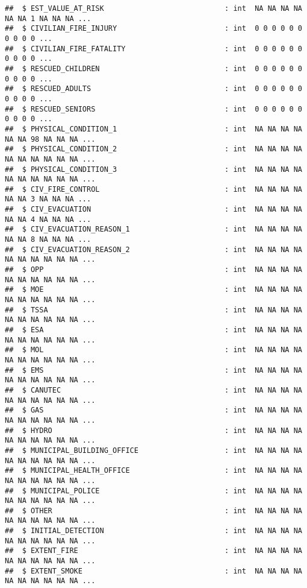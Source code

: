 \documentclass[]{article}
\begin{document}
\begin{verbatim}
##  $ EST_VALUE_AT_RISK                            : int  NA NA NA NA NA NA 1 NA NA NA ...
##  $ CIVILIAN_FIRE_INJURY                         : int  0 0 0 0 0 0 0 0 0 0 ...
##  $ CIVILIAN_FIRE_FATALITY                       : int  0 0 0 0 0 0 0 0 0 0 ...
##  $ RESCUED_CHILDREN                             : int  0 0 0 0 0 0 0 0 0 0 ...
##  $ RESCUED_ADULTS                               : int  0 0 0 0 0 0 0 0 0 0 ...
##  $ RESCUED_SENIORS                              : int  0 0 0 0 0 0 0 0 0 0 ...
##  $ PHYSICAL_CONDITION_1                         : int  NA NA NA NA NA NA 98 NA NA NA ...
##  $ PHYSICAL_CONDITION_2                         : int  NA NA NA NA NA NA NA NA NA NA ...
##  $ PHYSICAL_CONDITION_3                         : int  NA NA NA NA NA NA NA NA NA NA ...
##  $ CIV_FIRE_CONTROL                             : int  NA NA NA NA NA NA 3 NA NA NA ...
##  $ CIV_EVACUATION                               : int  NA NA NA NA NA NA 4 NA NA NA ...
##  $ CIV_EVACUATION_REASON_1                      : int  NA NA NA NA NA NA 8 NA NA NA ...
##  $ CIV_EVACUATION_REASON_2                      : int  NA NA NA NA NA NA NA NA NA NA ...
##  $ OPP                                          : int  NA NA NA NA NA NA NA NA NA NA ...
##  $ MOE                                          : int  NA NA NA NA NA NA NA NA NA NA ...
##  $ TSSA                                         : int  NA NA NA NA NA NA NA NA NA NA ...
##  $ ESA                                          : int  NA NA NA NA NA NA NA NA NA NA ...
##  $ MOL                                          : int  NA NA NA NA NA NA NA NA NA NA ...
##  $ EMS                                          : int  NA NA NA NA NA NA NA NA NA NA ...
##  $ CANUTEC                                      : int  NA NA NA NA NA NA NA NA NA NA ...
##  $ GAS                                          : int  NA NA NA NA NA NA NA NA NA NA ...
##  $ HYDRO                                        : int  NA NA NA NA NA NA NA NA NA NA ...
##  $ MUNICIPAL_BUILDING_OFFICE                    : int  NA NA NA NA NA NA NA NA NA NA ...
##  $ MUNICIPAL_HEALTH_OFFICE                      : int  NA NA NA NA NA NA NA NA NA NA ...
##  $ MUNICIPAL_POLICE                             : int  NA NA NA NA NA NA NA NA NA NA ...
##  $ OTHER                                        : int  NA NA NA NA NA NA NA NA NA NA ...
##  $ INITIAL_DETECTION                            : int  NA NA NA NA NA NA NA NA NA NA ...
##  $ EXTENT_FIRE                                  : int  NA NA NA NA NA NA NA NA NA NA ...
##  $ EXTENT_SMOKE                                 : int  NA NA NA NA NA NA NA NA NA NA ...

\end{verbatim}
\end{document}
